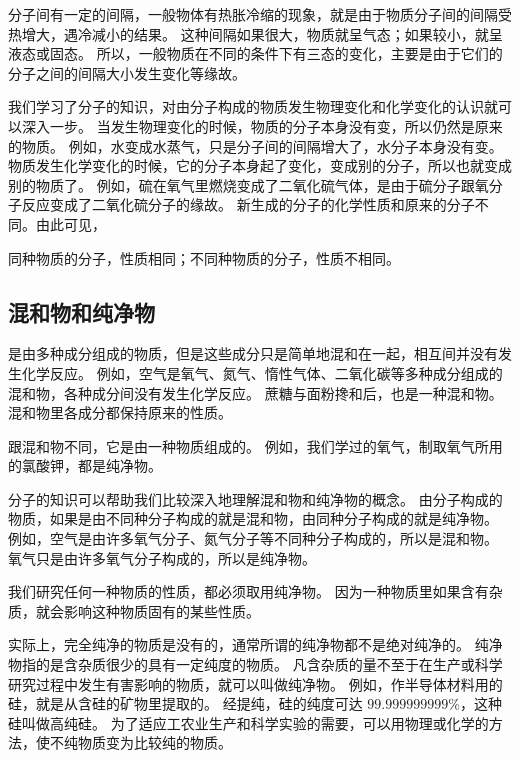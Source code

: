 分子间有一定的间隔，一般物体有热胀冷缩的现象，就是由于物质分子间的间隔受热增大，遇冷减小的结果。
这种间隔如果很大，物质就呈气态；如果较小，就呈液态或固态。
所以，一般物质在不同的条件下有三态的变化，主要是由于它们的分子之间的间隔大小发生变化等缘故。

我们学习了分子的知识，对由分子构成的物质发生物理变化和化学变化的认识就可以深入一步。
当发生物理变化的时候，物质的分子本身没有变，所以仍然是原来的物质。
例如，水变成水蒸气，只是分子间的间隔增大了，水分子本身没有变。
物质发生化学变化的时候，它的分子本身起了变化，变成别的分子，所以也就变成别的物质了。
例如，硫在氧气里燃烧变成了二氧化硫气体，是由于硫分子跟氧分子反应变成了二氧化硫分子的缘故。
新生成的分子的化学性质和原来的分子不同。由此可见，

同种物质的分子，性质相同；不同种物质的分子，性质不相同。


\subsection{混和物和纯净物}

是由多种成分组成的物质，但是这些成分只是简单地混和在一起，相互间并没有发生化学反应。
例如，空气是氧气、氮气、惰性气体、二氧化碳等多种成分组成的混和物，各种成分间没有发生化学反应。
蔗糖与面粉搀和后，也是一种混和物。混和物里各成分都保持原来的性质。

跟混和物不同，它是由一种物质组成的。
例如，我们学过的氧气，制取氧气所用的氯酸钾，都是纯净物。

分子的知识可以帮助我们比较深入地理解混和物和纯净物的概念。
由分子构成的物质，如果是由不同种分子构成的就是混和物，由同种分子构成的就是纯净物。
例如，空气是由许多氧气分子、氮气分子等不同种分子构成的，所以是混和物。
氧气只是由许多氧气分子构成的，所以是纯净物。

我们研究任何一种物质的性质，都必须取用纯净物。
因为一种物质里如果含有杂质，就会影响这种物质固有的某些性质。

实际上，完全纯净的物质是没有的，通常所谓的纯净物都不是绝对纯净的。
纯净物指的是含杂质很少的具有一定纯度的物质。
凡含杂质的量不至于在生产或科学研究过程中发生有害影响的物质，就可以叫做纯净物。
例如，作半导体材料用的硅，就是从含硅的矿物里提取的。
经提纯，硅的纯度可达 $99.999999999\%$，这种硅叫做高纯硅。
为了适应工农业生产和科学实验的需要，可以用物理或化学的方法，使不纯物质变为比较纯的物质。


